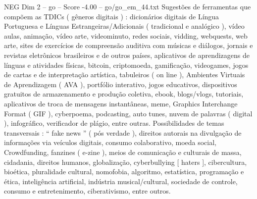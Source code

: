 \begin{textsample}{NEG Dim 2 – go – Score -4.00 – go/go\_em\_44.txt}
Sugestões de ferramentas que compõem as TDICs ( gêneros digitais ) : dicionários digitais de Língua Portuguesa e Línguas Estrangeiras/Adicionais ( tradicional e analógico ), vídeo aulas, animação, vídeo arte, videominuto, redes sociais, vidding, webquests, web arte, sites de exercícios de compreensão auditiva com músicas e diálogos, jornais e revistas eletrônicos brasileiros e de outros países, aplicativos de aprendizagens de línguas e atividades físicas, bitcoin, criptomoeda, gamificação, videogames, jogos de cartas e de interpretação artística, tabuleiros ( on line ), Ambientes Virtuais de Aprendizagem ( AVA ), portfólio interativo, jogos educativos, dispositivos gratuitos de armazenamento e produção coletiva, ebook, blogs/vlogs, tutoriais, aplicativos de troca de mensagens instantâneas, meme, Graphics Interchange Format ( GIF ), cyberpoema, podcasting, auto tunes, nuvem de palavras ( digital ), infográfico, verificador de plágio, entre outras.
Possibilidades de temas transversais : “ fake news ” ( pós verdade ), direitos autorais na divulgação de informações via veículos digitais, consumo colaborativo, moeda social, Crowdfunding, fanzines ( e-zine ), meios de comunicação e culturais de massa, cidadania, direitos humanos, globalização, cyberbullying [ haters ], cibercultura, bioética, pluralidade cultural, nomofobia, algoritmo, estatística, programação e ética, inteligência artificial, indústria musical/cultural, sociedade de controle, consumo e entretenimento, ciberativismo, entre outros.

\end{textsample}

